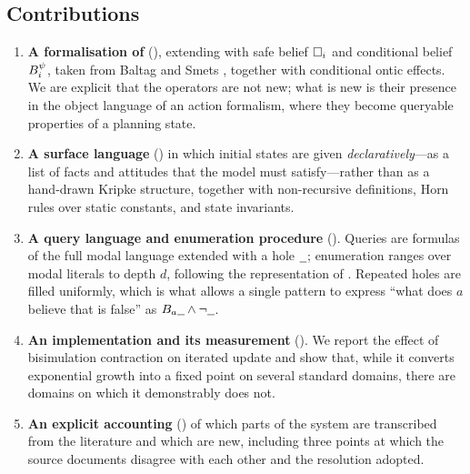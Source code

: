\documentclass[11pt,a4paper]{article}
\begin{document}
\subsection{Contributions}

\begin{enumerate}
  \item \textbf{A formalisation of \mBplus} (), extending \mB{}
    \citep{buckingham2021thesis} with safe belief $\Box_{i}$ and conditional belief
    $B^{\psi}_{i}$, taken from Baltag and Smets \citep{baltag2008}, together with
    conditional ontic effects. We are explicit that the operators are not new; what is new
    is their presence in the object language of an action formalism, where they become
    queryable properties of a planning state.

  \item \textbf{A surface language} () in which initial states are given
    \emph{declaratively}---as a list of facts and attitudes that the model must
    satisfy---rather than as a hand-drawn Kripke structure, together with non-recursive
    definitions, Horn rules over static constants, and state invariants.

  \item \textbf{A query language and enumeration procedure} (). Queries are
    formulas of the full modal language extended with a hole $\hole$; enumeration ranges over
    modal literals to depth $d$, following the representation of \citet{muise2015}. Repeated
    holes are filled uniformly, which is what allows a single pattern to express ``what does
    $a$ believe that is false'' as $\Bop{a}\hole \wedge \neg\hole$.

  \item \textbf{An implementation and its measurement} (). We report
    the effect of bisimulation contraction on iterated update and show that, while it
    converts exponential growth into a fixed point on several standard domains, there are
    domains on which it demonstrably does not.

  \item \textbf{An explicit accounting} () of which parts of the system are
    transcribed from the literature and which are new, including three points at which the
    source documents disagree with each other and the resolution adopted.
\end{enumerate}
\end{document}
